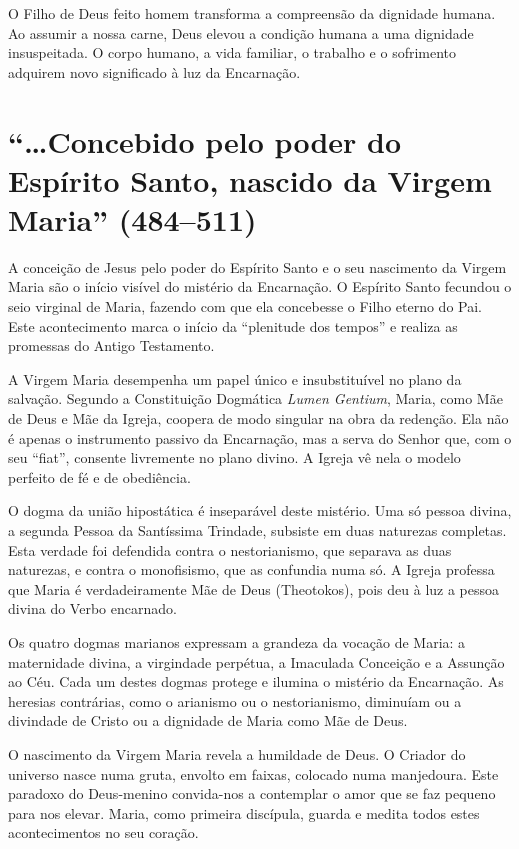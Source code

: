 O Filho de Deus feito homem transforma a compreensão da dignidade humana. Ao assumir a nossa carne, Deus elevou a condição humana a uma dignidade insuspeitada. O corpo humano, a vida familiar, o trabalho e o sofrimento adquirem novo significado à luz da Encarnação.

\section{``\ldots Concebido pelo poder do Espírito Santo, nascido da Virgem Maria'' (484--511)}

A conceição de Jesus pelo poder do Espírito Santo e o seu nascimento da Virgem Maria são o início visível do mistério da Encarnação. O Espírito Santo fecundou o seio virginal de Maria, fazendo com que ela concebesse o Filho eterno do Pai. Este acontecimento marca o início da ``plenitude dos tempos'' e realiza as promessas do Antigo Testamento.

A Virgem Maria desempenha um papel único e insubstituível no plano da salvação. Segundo a Constituição Dogmática \emph{Lumen Gentium}, Maria, como Mãe de Deus e Mãe da Igreja, coopera de modo singular na obra da redenção. Ela não é apenas o instrumento passivo da Encarnação, mas a serva do Senhor que, com o seu ``fiat'', consente livremente no plano divino. A Igreja vê nela o modelo perfeito de fé e de obediência.

O dogma da união hipostática é inseparável deste mistério. Uma só pessoa divina, a segunda Pessoa da Santíssima Trindade, subsiste em duas naturezas completas. Esta verdade foi defendida contra o nestorianismo, que separava as duas naturezas, e contra o monofisismo, que as confundia numa só. A Igreja professa que Maria é verdadeiramente Mãe de Deus (Theotokos), pois deu à luz a pessoa divina do Verbo encarnado.

Os quatro dogmas marianos expressam a grandeza da vocação de Maria: a maternidade divina, a virgindade perpétua, a Imaculada Conceição e a Assunção ao Céu. Cada um destes dogmas protege e ilumina o mistério da Encarnação. As heresias contrárias, como o arianismo ou o nestorianismo, diminuíam ou a divindade de Cristo ou a dignidade de Maria como Mãe de Deus.

O nascimento da Virgem Maria revela a humildade de Deus. O Criador do universo nasce numa gruta, envolto em faixas, colocado numa manjedoura. Este paradoxo do Deus-menino convida-nos a contemplar o amor que se faz pequeno para nos elevar. Maria, como primeira discípula, guarda e medita todos estes acontecimentos no seu coração.


